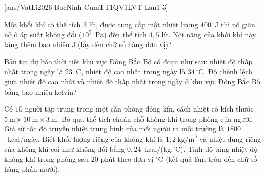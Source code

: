 	\subsection*{}
	\setcounter{ex}{0}
	[ans/VatLi2026-BacNinh-CumTT1QV1LVT-Lan1-3]

	\begin{ex}%
		Một khối khí có thể tích $3$ lít, được cung cấp một nhiệt lượng $400$~J thì nó giãn nở ở áp suất không đổi ($10^5$~Pa) đến thể tích $4{,}5$ lít. Nội năng của khối khí này tăng thêm bao nhiêu J (lấy đến chữ số hàng đơn vị)?
		\par
	\end{ex}

	\begin{ex}%
		Bản tin dự báo thời tiết khu vực Đông Bắc Bộ có đoạn như sau: nhiệt độ thấp nhất trong ngày là $23\,^\circ\text{C}$, nhiệt độ cao nhất trong ngày là $34\,^\circ\text{C}$. Độ chênh lệch giữa nhiệt độ cao nhất và nhiệt độ thấp nhất trong ngày ở khu vực Đông Bắc Bộ bằng bao nhiêu kelvin?
		\par
	\end{ex}

	\begin{ex}%
		Có $10$ người tập trung trong một căn phòng đóng kín, cách nhiệt có kích thước $5~\text{m}\times 10~\text{m}\times 3~\text{m}$. Bỏ qua thể tích choán chỗ không khí trong phòng của người. Giả sử tốc độ truyền nhiệt trung bình của mỗi người ra môi trường là $1800$~kcal/ngày. Biết khối lượng riêng của không khí là $1{,}2~\text{kg/m}^3$ và nhiệt dung riêng của không khí coi như không đổi bằng $0{,}24$~kcal/(kg.$^\circ$C). Tính độ tăng nhiệt độ không khí trong phòng sau $20$ phút theo đơn vị $^\circ$C (kết quả làm tròn đến chữ số hàng phần mười).
		\par
	\end{ex}


